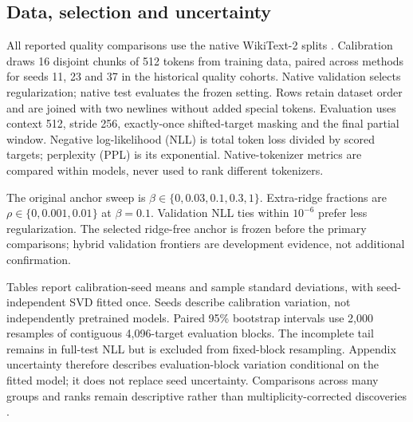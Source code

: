 \documentclass[conference]{IEEEtran}
\begin{document}
\subsection{Data, selection and uncertainty}
All reported quality comparisons use the native WikiText-2 splits \cite{merity2016wikitext}. Calibration draws 16 disjoint chunks of 512 tokens from training data, paired across methods for seeds 11, 23 and 37 in the historical quality cohorts. Native validation selects regularization; native test evaluates the frozen setting. Rows retain dataset order and are joined with two newlines without added special tokens. Evaluation uses context 512, stride 256, exactly-once shifted-target masking and the final partial window. Negative log-likelihood (NLL) is total token loss divided by scored targets; perplexity (PPL) is its exponential. Native-tokenizer metrics are compared within models, never used to rank different tokenizers.\par\smallskip
The original anchor sweep is $\beta\in\{0,0.03,0.1,0.3,1\}$. Extra-ridge fractions are $\rho\in\{0,0.001,0.01\}$ at $\beta=0.1$. Validation NLL ties within $10^{-6}$ prefer less regularization. The selected ridge-free anchor is frozen before the primary comparisons; hybrid validation frontiers are development evidence, not additional confirmation.\par\smallskip
Tables report calibration-seed means and sample standard deviations, with seed-independent SVD fitted once. Seeds describe calibration variation, not independently pretrained models. Paired 95\% bootstrap intervals use 2,000 resamples of contiguous 4,096-target evaluation blocks. The incomplete tail remains in full-test NLL but is excluded from fixed-block resampling. Appendix uncertainty therefore describes evaluation-block variation conditional on the fitted model; it does not replace seed uncertainty. Comparisons across many groups and ranks remain descriptive rather than multiplicity-corrected discoveries \cite{biderman2024evaluation}.\par\smallskip
\end{document}
